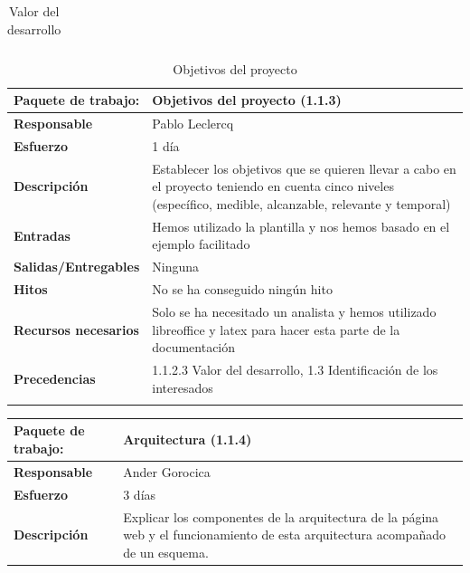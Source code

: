 \documentclass{report}
\begin{document}
\begin{center}
\begin{longtable}{|p{6cm}|p{6cm}|}
                    \caption{Valor del desarrollo}
                \end{longtable}
                \clearpage
                \begin{longtable}{|p{6cm}|p{6cm}|}
                    \hline
                    \textbf{Paquete de trabajo:} & Objetivos del proyecto (1.1.3)\\
                    \hline
                    \textbf{Responsable} & Pablo Leclercq\\
                    \hline
                    \textbf{Esfuerzo} & 1 día\\
                    \hline
                    \textbf{Descripción} & Establecer los objetivos que se quieren llevar a cabo en el proyecto teniendo en cuenta cinco niveles (específico, medible, alcanzable, relevante y temporal)\\
                    \hline
                    \textbf{Entradas} & Hemos utilizado la plantilla y nos hemos basado en el ejemplo facilitado\\
                    \hline
                    \textbf{Salidas/Entregables} & Ninguna\\
                    \hline
                    \textbf{Hitos} & No se ha conseguido ningún hito\\
                    \hline
                    \textbf{Recursos necesarios} & Solo se ha necesitado un analista y hemos utilizado libreoffice y latex para hacer esta parte de la documentación\\
                    \hline
                    \textbf{Precedencias} & 1.1.2.3 Valor del desarrollo,
                                            1.3 Identificación de los interesados\\
                    \hline
                    \caption{Objetivos del proyecto}
                \end{longtable}
                \begin{longtable}{|p{6cm}|p{6cm}|}
                    \hline
                    \textbf{Paquete de trabajo:} & Arquitectura (1.1.4)\\
                    \hline
                    \textbf{Responsable} & Ander Gorocica\\
                    \hline
                    \textbf{Esfuerzo} & 3 días\\
                    \hline
                    \textbf{Descripción} & Explicar los componentes de la arquitectura de la página web y el funcionamiento de esta arquitectura acompañado de un esquema.\\

\end{longtable}
\end{center}
\end{document}
